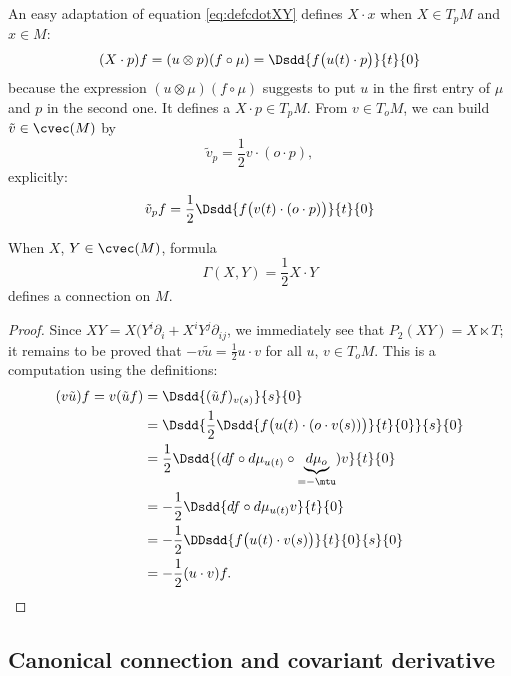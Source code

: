An easy adaptation of equation \eqref{eq:defcdotXY} defines $X\cdot x$ when $X\in T_pM$ and $x\in M$:
\begin{equation}
(X\cdot p)f=(u\otimes p)(f\circ\mu)=\Dsdd{ f\big( u(t)\cdot p \big) }{t}{0}
\end{equation}
because the expression $(u\otimes\mu)(f\circ \mu)$ suggests to put $u$ in the first entry of $\mu$ and $p$ in the second one.
It defines a $X\cdot p\in T_pM$. From $v\in T_oM$, we can build $\tilde v\in\cvec(M)$ by
\begin{equation}
  \tilde v_p=\frac{1}{2}v\cdot(o\cdot p),
\end{equation}
explicitly:
\[
  \tilde v_pf=\frac{1}{2}\Dsdd{ f\big( v(t)\cdot(o\cdot p) \big) }{t}{0}
\]

\begin{theorem}
  When $X$, $Y\in\cvec(M)$, formula
\begin{equation}
   \Gamma(X,Y)=\frac{1}{2}X\cdot Y
\end{equation}
defines a connection on $M$.

\end{theorem}

\begin{proof}
 Since $XY=X(Y^i\partial_i+X^iY^j\partial_{ij}$, we immediately see that  $P_2(XY)=X\ltimes T$;
it remains to be proved that $-v\tilde u=\frac{1}{2}u\cdot v$ for all $u$, $v\in T_oM$. This is a computation using the definitions:
\begin{equation}
\begin{split}
   (v\tilde u)f=v(\tilde u f)&=\Dsdd{ (\tilde u f)_{v(s)} }{s}{0}\\
		&=\Dsdd{     \frac{1}{2}\Dsdd{ f\big( u(t)\cdot (o\cdot v(s)) \big) }{t}{0}       }{s}{0}\\
		&=\frac{1}{2}\Dsdd{   (df\circ d\mu_{u(t)}\circ \underbrace{d\mu_o}_{=-\mtu})v   }{t}{0}\\
		&=-\frac{1}{2}\Dsdd{ df\circ d\mu_{u(t)}v }{t}{0}\\
		&=-\frac{1}{2} \DDsdd{ f\big( u(t)\cdot v(s) \big) }{t}{0}{s}{0}\\
		&=-\frac{1}{2}(u\cdot v)f.
\end{split}
\end{equation}
\end{proof}

\subsection{Canonical connection and covariant derivative}  \label{subsecCanConCovDer}

